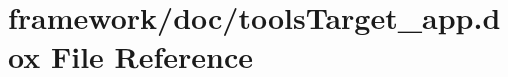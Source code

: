 \hypertarget{tools_target__app_8dox}{}\section{framework/doc/tools\+Target\+\_\+app.dox File Reference}
\label{tools_target__app_8dox}
